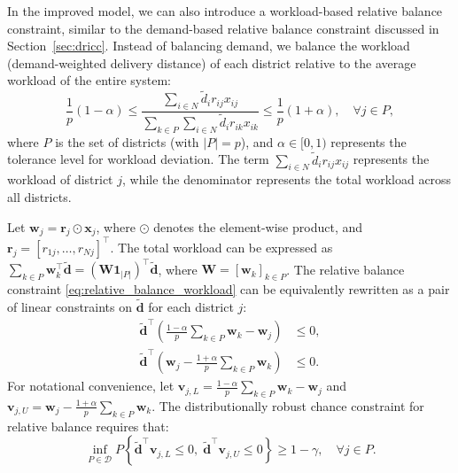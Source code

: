 \documentclass[preprint,12pt,authoryear]{elsarticle}
\begin{document}
In the improved model, we can also introduce a workload-based relative balance constraint, similar to the demand-based relative balance constraint discussed in Section~\ref{sec:dricc}. Instead of balancing demand, we balance the workload (demand-weighted delivery distance) of each district relative to the average workload of the entire system:
\begin{equation}
\frac{1}{p}(1 - \alpha) \leqslant \frac{\sum_{i \in N} \tilde{d}_i r_{ij} x_{ij}}{\sum_{k \in P} \sum_{i \in N} \tilde{d}_i r_{ik} x_{ik}} \leqslant \frac{1}{p}(1 + \alpha), \quad \forall j \in P,
\label{eq:relative_balance_workload}
\end{equation}
where $P$ is the set of districts (with $|P|=p$), and $\alpha \in [0, 1)$ represents the tolerance level for workload deviation. The term $\sum_{i \in N} \tilde{d}_i r_{ij} x_{ij}$ represents the workload of district $j$, while the denominator represents the total workload across all districts.

Let $\mathbf{w}_j = \mathbf{r}_j \odot \mathbf{x}_j$, where $\odot$ denotes the element-wise product, and $\mathbf{r}_j = [r_{1j}, \dots, r_{Nj}]^\top$. The total workload can be expressed as $\sum_{k \in P} \mathbf{w}_k^\top \tilde{\mathbf{d}} = (\mathbf{W} \mathbf{1}_{|P|})^\top \tilde{\mathbf{d}}$, where $\mathbf{W} = [\mathbf{w}_k]_{k \in P}$. The relative balance constraint \eqref{eq:relative_balance_workload} can be equivalently rewritten as a pair of linear constraints on $\tilde{\mathbf{d}}$ for each district $j$:
\begin{align}
\tilde{\mathbf{d}}^\top \left( \frac{1-\alpha}{p} \sum_{k \in P} \mathbf{w}_k - \mathbf{w}_j \right) &\leqslant 0, \label{eq:rel_workload_lower_linear} \\
\tilde{\mathbf{d}}^\top \left( \mathbf{w}_j - \frac{1+\alpha}{p} \sum_{k \in P} \mathbf{w}_k \right) &\leqslant 0. \label{eq:rel_workload_upper_linear}
\end{align}
For notational convenience, let $\mathbf{v}_{j,L} = \frac{1-\alpha}{p} \sum_{k \in P} \mathbf{w}_k - \mathbf{w}_j$ and $\mathbf{v}_{j,U} = \mathbf{w}_j - \frac{1+\alpha}{p} \sum_{k \in P} \mathbf{w}_k$. The distributionally robust chance constraint for relative balance requires that:
\begin{equation}
\inf_{P \in \mathcal{D}} P \left\{ \tilde{\mathbf{d}}^\top \mathbf{v}_{j,L} \leqslant 0, \; \tilde{\mathbf{d}}^\top \mathbf{v}_{j,U} \leqslant 0 \right\} \geqslant 1 - \gamma, \quad \forall j \in P.
\label{eq:dricc_rel_workload_joint}
\end{equation}
\end{document}
